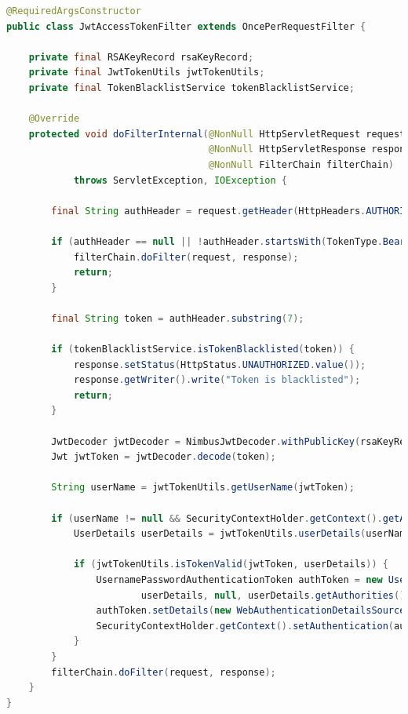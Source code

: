 \begin{lstlisting}[language=Java, style=JavaStyle, caption=Kod niestandardowego filtra \texttt{JwtAccessTokenFilter}]
@RequiredArgsConstructor
public class JwtAccessTokenFilter extends OncePerRequestFilter {

    private final RSAKeyRecord rsaKeyRecord;
    private final JwtTokenUtils jwtTokenUtils;
    private final TokenBlacklistService tokenBlacklistService;

    @Override
    protected void doFilterInternal(@NonNull HttpServletRequest request, 
                                    @NonNull HttpServletResponse response, 
                                    @NonNull FilterChain filterChain) 
            throws ServletException, IOException {

        final String authHeader = request.getHeader(HttpHeaders.AUTHORIZATION);

        if (authHeader == null || !authHeader.startsWith(TokenType.Bearer.name())) {
            filterChain.doFilter(request, response);
            return;
        }

        final String token = authHeader.substring(7);

        if (tokenBlacklistService.isTokenBlacklisted(token)) {
            response.setStatus(HttpStatus.UNAUTHORIZED.value());
            response.getWriter().write("Token is blacklisted");
            return;
        }

        JwtDecoder jwtDecoder = NimbusJwtDecoder.withPublicKey(rsaKeyRecord.publicKey()).build();
        Jwt jwtToken = jwtDecoder.decode(token);

        String userName = jwtTokenUtils.getUserName(jwtToken);

        if (userName != null && SecurityContextHolder.getContext().getAuthentication() == null) {
            UserDetails userDetails = jwtTokenUtils.userDetails(userName);

            if (jwtTokenUtils.isTokenValid(jwtToken, userDetails)) {
                UsernamePasswordAuthenticationToken authToken = new UsernamePasswordAuthenticationToken(
                        userDetails, null, userDetails.getAuthorities());
                authToken.setDetails(new WebAuthenticationDetailsSource().buildDetails(request));
                SecurityContextHolder.getContext().setAuthentication(authToken);
            }
        }
        filterChain.doFilter(request, response);
    }
}
\end{lstlisting}

